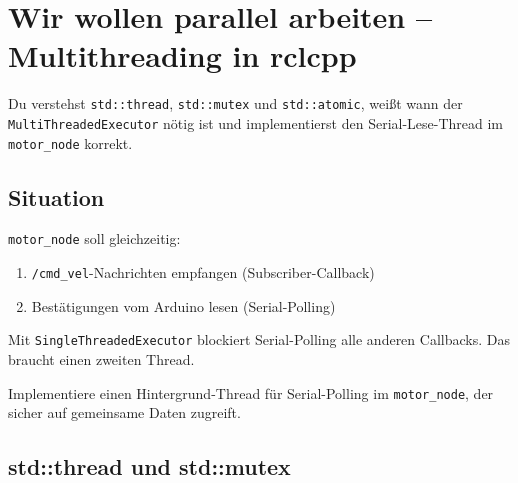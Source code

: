 \chapter{Wir wollen parallel arbeiten –
  Multithreading in rclcpp}

\begin{lernziele}
Du verstehst \texttt{std::thread}, \texttt{std::mutex} und
\texttt{std::atomic}, weißt wann der \texttt{MultiThreadedExecutor}
nötig ist und implementierst den Serial-Lese-Thread
im \texttt{motor\_node} korrekt.
\end{lernziele}

\section{Situation}

\texttt{motor\_node} soll gleichzeitig:
\begin{enumerate}
\item \texttt{/cmd\_vel}-Nachrichten empfangen (Subscriber-Callback)
\item Bestätigungen vom Arduino lesen (Serial-Polling)
\end{enumerate}

Mit \texttt{SingleThreadedExecutor} blockiert Serial-Polling
alle anderen Callbacks. Das braucht einen zweiten Thread.

\begin{aufgabeBox}
Implementiere einen Hintergrund-Thread für Serial-Polling
im \texttt{motor\_node}, der sicher auf gemeinsame Daten zugreift.
\end{aufgabeBox}

\section{std::thread und std::mutex}

